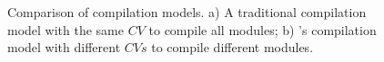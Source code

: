 \begin{figure}
\centering
{}
\caption{Comparison of compilation models. a) A traditional compilation
  model with the same $CV$ to compile all modules; b) \toolname's
  compilation model with different $CVs$ to compile
  different modules.}
\label{fig:cms}
\vspace{-4mm}
\end{figure}
\fi


